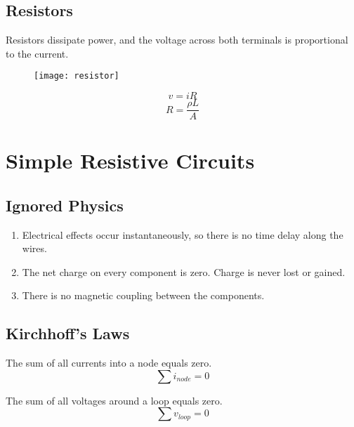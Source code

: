 \documentclass{article}
\begin{document}
\subsection{Resistors}
\begin{definition}[Resistor]
    Resistors dissipate power, and the voltage across both terminals is proportional to the current.
\end{definition}
\begin{figure}[H]
    \centering
    \texttt{[image: resistor]}
    \caption{}
\end{figure}
\begin{theorem}
    \begin{equation*}
        v=iR
    \end{equation*}
    \begin{equation*}
        R=\frac{\rho L}{A}
    \end{equation*}
\end{theorem}
\newpage
\section{Simple Resistive Circuits}
\subsection{Ignored Physics}
\begin{enumerate}
    \item Electrical effects occur instantaneously, so there is no time delay along the wires.
    \item The net charge on every component is zero. Charge is never lost or gained.
    \item There is no magnetic coupling between the components.
\end{enumerate}
\subsection{Kirchhoff's Laws}
\begin{definition}
    The sum of all currents into a node equals zero.
    \begin{equation*}
        \sum i_{node} = 0
    \end{equation*}
\end{definition}
\begin{definition}
    The sum of all voltages around a loop equals zero.
    \begin{equation*}
        \sum v_{loop} = 0
    \end{equation*}
\end{definition}
\end{document}
